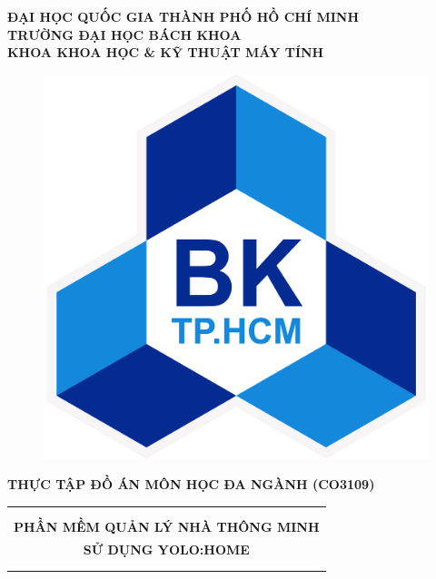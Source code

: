 \documentclass[a4paper, 13pt]{article}
\theoremstyle{definition}
\begin{document}
\begin{titlepage}
\begin{center}
\textbf{\large ĐẠI HỌC QUỐC GIA THÀNH PHỐ HỒ CHÍ MINH} \\
\textbf{\large TRƯỜNG ĐẠI HỌC BÁCH KHOA} \\
\textbf{\large KHOA KHOA HỌC \& KỸ THUẬT MÁY TÍNH} 
\end{center}

\vspace{1cm}

\begin{figure}[h!]
\begin{center}
\includegraphics[scale = 0.25]{img/hcmut.png}
\end{center}
\end{figure}

\vspace{0.5cm}


\begin{center}
\begin{center}
    \textbf{{\large THỰC TẬP ĐỒ ÁN MÔN HỌC ĐA NGÀNH (CO3109) }}
\end{center}

\vspace{0.5cm}
\begin{tabular}{c}
\hline
\\
\\
\textbf{\LARGE PHẦN MỀM QUẢN LÝ NHÀ THÔNG MINH}\\
\textbf{\LARGE SỬ DỤNG YOLO:HOME}\\
\\
\\
\hline
\end{tabular}
\end{center}


\end{titlepage}
\end{document}
